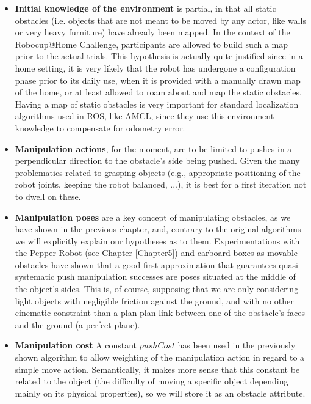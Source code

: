 \begin{itemize}
  \item \textbf{Initial knowledge of the environment} is partial, in that all static obstacles (i.e. objects that are not meant to be moved by any actor, like walls or very heavy furniture) have already been mapped. In the context of the Robocup@Home Challenge, participants are allowed to build such a map prior to the actual trials. This hypothesis is actually quite justified since in a home setting, it is very likely that the robot has undergone a configuration phase prior to its daily use, when it is provided with a manually drawn map of the home, or at least allowed to roam about and map the static obstacles. Having a map of static obstacles is very important for standard localization algorithms used in ROS, like \href{http://wiki.ros.org/amcl}{AMCL}, since they use this environment knowledge to compensate for odometry error.
  \item \textbf{Manipulation actions}, for the moment, are to be limited to pushes in a perpendicular direction to the obstacle's side being pushed. Given the many problematics related to grasping objects (e.g., appropriate positioning of the robot joints, keeping the robot balanced, ...), it is best for a first iteration not to dwell on these.
  \item \textbf{Manipulation poses} are a key concept of manipulating obstacles, as we have shown in the previous chapter, and, contrary to the original algorithms we will explicitly explain our hypotheses as to them. Experimentations with the Pepper Robot (see Chapter \ref{Chapter5}) and carboard boxes as movable obstacles have shown that a good first approximation that guarantees quasi-systematic push manipulation successes are poses situated at the middle of the object's sides. This is, of course, supposing that we are only considering light objects with negligible friction against the ground, and with no other cinematic constraint than a plan-plan link between one of the obstacle's faces and the ground (a perfect plane).
  \item \textbf{Manipulation cost} A constant $pushCost$ has been used in the previously shown algorithm to allow weighting of the manipulation action in regard to a simple move action. Semantically, it makes more sense that this constant be related to the object (the difficulty of moving a specific object depending mainly on its physical properties), so we will store it as an obstacle attribute.

\end{itemize}
